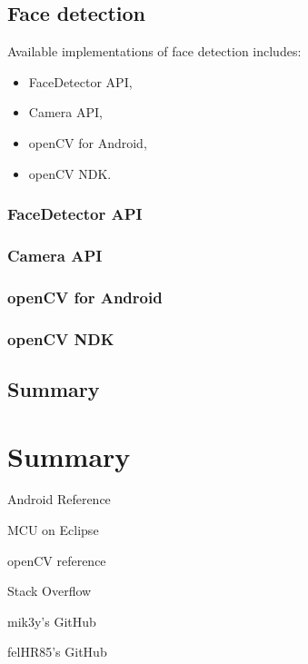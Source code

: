 \documentclass[openany]{mgr} %
\begin{document}
\section{Face detection}
Available implementations of face detection includes:
\begin{itemize}
  \item FaceDetector API,
  \item Camera API,
  \item openCV for Android,
  \item openCV NDK.
\end{itemize}


\subsection{FaceDetector API}
\subsection{Camera API}
\subsection{openCV for Android}
\subsection{openCV NDK}

\section{Summary}

\chapter{Summary}

\begin{thebibliography}{9}
 Android Reference

 MCU on Eclipse

 openCV reference

 Stack Overflow

 mik3y's GitHub

 felHR85's GitHub

\end{thebibliography}
\end{document}

